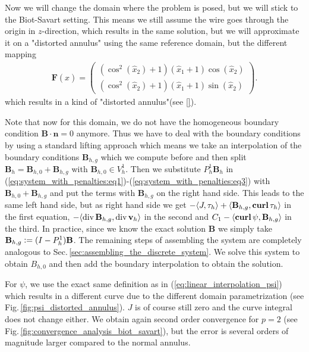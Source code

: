 \documentclass[../master_thesis.tex]{subfiles}
\begin{document}
Now we will change the domain where the problem is posed, but we will 
stick to the Biot-Savart setting. This means we still assume the wire 
goes through the origin in $z$-direction, which results in the same solution, 
but we will approximate it
on a "distorted annulus" using the same reference domain, but the different mapping 
\begin{align*}
    \mathbf{F}(\hat{x}) = \begin{pmatrix}
        (\cos^2(\hat{x}_2 ) + 1 )(\hat{x}_1 + 1)\cos(\hat{x}_2 ) 
        \\ (\cos^2(\hat{x}_2 ) + 1 ) (\hat{x}_1 + 1)\sin(\hat{x}_2 ) 
    \end{pmatrix}.
\end{align*}
which results in a kind of "distorted annulus"(see \ref{}). 

Note that now for this domain, we do not have 
the homogeneous boundary condition
$\mathbf{B}\cdot \mathbf{n} = 0$ anymore. Thus we have to deal with the boundary conditions 
by using a standard lifting approach which means we take an interpolation of the boundary conditions 
$\mathbf{B}_{h,g}$ which we compute before and then split
$\mathbf{B}_{h} = \mathbf{B}_{h,0} + \mathbf{B}_{h,g}$ with $\mathbf{B}_{h,0}\in V_h^1$.
Then we substitute $P_h^1 \mathbf{B}_h$ in 
(\ref{eq:system_with_penalties:eq1})-(\ref{eq:system_with_penalties:eq3}) 
with $\mathbf{B}_{h,0} + \mathbf{B}_{h,g}$ and put the terms with  
$\mathbf{B}_{h,g}$ on the right hand side. 
This leads to the same left hand side, but as right hand side we get
$-\langle J, \tau_h \rangle + \langle \mathbf{B}_{h,g}, \veccurl \tau_h \rangle$ in 
the first equation, $-\langle\operatorname{div}  \mathbf{B}_{h,g} ,\operatorname{div} \mathbf{v}_{h} \rangle$
in the second and $C_1 - \langle\veccurl \psi,\mathbf{B}_{h,g} \rangle$ 
in the third. In practice, since we know the exact solution $\mathbf{B}$ we simply take 
$\mathbf{B}_{h,g} \vcentcolon= (I-P^1_h)\mathbf{B}$. The remaining steps of assembling 
the system are completely analogous to Sec.\,\ref{sec:assembling_the_discrete_system}. 
We solve this system to obtain $B_{h,0}$ and then add the boundary 
interpolation to obtain the solution.

For $\psi$, we use the exact same definition as in (\ref{eq:linear_interpolation_psi}) 
which results in a different 
curve due to the different domain parametrization (see Fig.\,\ref{fig:psi_distorted_annulus}). $J$ is of course
still zero and the curve integral does not change either. We obtain again 
second order convergence for $p=2$ (see Fig.\,\ref{fig:convergence_analysis_biot_savart}), 
but the error is several orders of magnitude larger compared to the normal annulus. 
\end{document}
